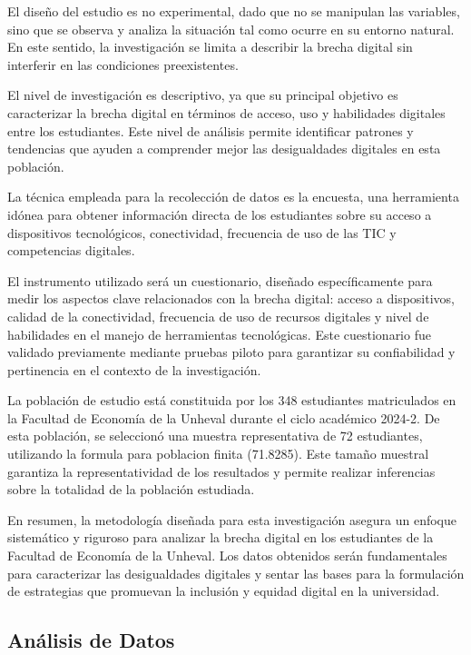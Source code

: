 \documentclass[12pt, a4paper]{article}
\begin{document}
El diseño del estudio es no experimental, dado que no se manipulan las variables, sino que se observa y analiza la situación tal como ocurre en su entorno natural. En este sentido, la investigación se limita a describir la brecha digital sin interferir en las condiciones preexistentes.  

El nivel de investigación es descriptivo, ya que su principal objetivo es caracterizar la brecha digital en términos de acceso, uso y habilidades digitales entre los estudiantes. Este nivel de análisis permite identificar patrones y tendencias que ayuden a comprender mejor las desigualdades digitales en esta población.  

La técnica empleada para la recolección de datos es la encuesta, una herramienta idónea para obtener información directa de los estudiantes sobre su acceso a dispositivos tecnológicos, conectividad, frecuencia de uso de las TIC y competencias digitales.  

El instrumento utilizado será un cuestionario, diseñado específicamente para medir los aspectos clave relacionados con la brecha digital: acceso a dispositivos, calidad de la conectividad, frecuencia de uso de recursos digitales y nivel de habilidades en el manejo de herramientas tecnológicas. Este cuestionario fue validado previamente mediante pruebas piloto para garantizar su confiabilidad y pertinencia en el contexto de la investigación.

La población de estudio está constituida por los 348 estudiantes matriculados en la Facultad de Economía de la Unheval durante el ciclo académico 2024-2. De esta población, se seleccionó una muestra representativa de 72 estudiantes, utilizando la formula para poblacion finita (71.8285). Este tamaño muestral garantiza la representatividad de los resultados y permite realizar inferencias sobre la totalidad de la población estudiada.

En resumen, la metodología diseñada para esta investigación asegura un enfoque sistemático y riguroso para analizar la brecha digital en los estudiantes de la Facultad de Economía de la Unheval. Los datos obtenidos serán fundamentales para caracterizar las desigualdades digitales y sentar las bases para la formulación de estrategias que promuevan la inclusión y equidad digital en la universidad.

\subsection{Análisis de Datos}
\end{document}
